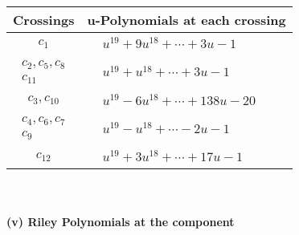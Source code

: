 \documentclass[1p]{elsarticle_modified}
\theoremstyle{definition}
\begin{document}
\begin{tabular}{m{50pt}|m{274pt}}
Crossings & \hspace{64pt}u-Polynomials at each crossing \\
\hline $$\begin{aligned}c_{1}\end{aligned}$$&$\begin{aligned}
&u^{19}+9 u^{18}+\cdots+3 u-1
\end{aligned}$\\
\hline $$\begin{aligned}c_{2},c_{5},c_{8}\\c_{11}\end{aligned}$$&$\begin{aligned}
&u^{19}+u^{18}+\cdots+3 u-1
\end{aligned}$\\
\hline $$\begin{aligned}c_{3},c_{10}\end{aligned}$$&$\begin{aligned}
&u^{19}-6 u^{18}+\cdots+138 u-20
\end{aligned}$\\
\hline $$\begin{aligned}c_{4},c_{6},c_{7}\\c_{9}\end{aligned}$$&$\begin{aligned}
&u^{19}- u^{18}+\cdots-2 u-1
\end{aligned}$\\
\hline $$\begin{aligned}c_{12}\end{aligned}$$&$\begin{aligned}
&u^{19}+3 u^{18}+\cdots+17 u-1
\end{aligned}$\\
\hline
\end{tabular}\\~\\
\newpage\renewcommand{\arraystretch}{1}
\flushleft \textbf{(v) Riley Polynomials at the component}\newline \\
\end{document}
